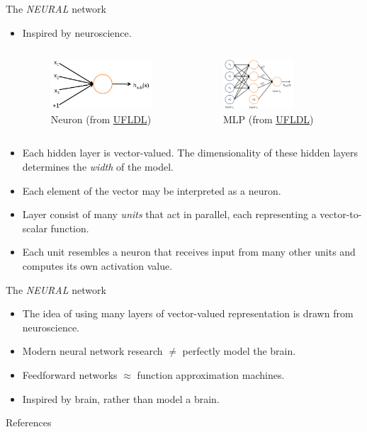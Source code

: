 \documentclass[10pt]{beamer}
\begin{document}
	\begin{frame}{The \emph{NEURAL} network}
		\begin{itemize}
			\item Inspired by neuroscience.
			\begin{columns}
				\begin{figure}
					\includegraphics[height=5em]{figures/neuron.png}
					\caption{Neuron (from \href{http://deeplearning.stanford.edu/wiki/index.php/File:SingleNeuron.png}{UFLDL})}
				\end{figure}
			
				\begin{figure}
					\includegraphics[height=5em]{figures/multilayer-perceptron.png}
					\caption{MLP (from \href{http://ufldl.stanford.edu/wiki/index.php/File:Network331.png}{UFLDL})}
				\end{figure}
					
			\end{columns}
			\item Each hidden layer is vector-valued. The dimensionality of these hidden layers determines the \emph{width} of the model.
			\item Each element of the vector may be interpreted as a neuron.
			\item Layer consist of many \emph{units} that act in parallel, each representing a vector-to-scalar function.
			\item Each unit resembles a neuron that receives input from many other units and computes its own activation value.
		\end{itemize}
	\end{frame}

	\begin{frame}{The \emph{NEURAL} network}
		\begin{itemize}
			\item The idea of using many layers of vector-valued representation is drawn from neuroscience.
			\item Modern neural network research $\ne$ perfectly model the brain.
			\item Feedforward networks $\approx$ function approximation machines.
			\item Inspired by brain, rather than model a brain.
		\end{itemize}
	\end{frame}


	\begin{frame}[allowframebreaks]{References}
		
		
	\end{frame}
\end{document}

